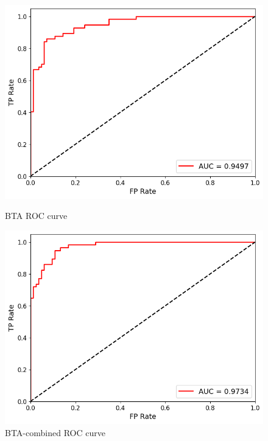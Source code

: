 \documentclass{article}
\begin{document}
\begin{figure}[htbp]
    \centering
    \begin{minipage}[t]{0.48\textwidth}
        \centering
        \includegraphics[width=\linewidth]{fig/BTA_roc-auc.png}
        \caption*{BTA ROC curve}
    \end{minipage}
    \hfill
    \begin{minipage}[t]{0.48\textwidth}
        \centering
        \includegraphics[width=\linewidth]{fig/BTA-combined_roc-auc.png}
        \caption*{BTA-combined ROC curve}
    \end{minipage}
    \hfill
    \begin{minipage}[t]{0.5\textwidth}
        \centering

\end{minipage}
\end{figure}
\end{document}

